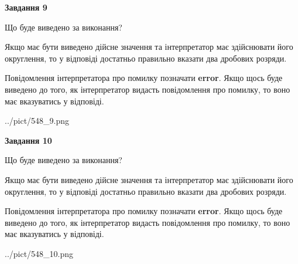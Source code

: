 \documentclass[12pt, ukrainian]{article}
\begin{document}
{\begin {Large}
{\begin {center}\textbf{Завдання 9}\end {center}}\par
Що буде виведено за виконання? \par

Якщо має бути виведено дійсне значення та інтерпретатор має здійснювати його округлення, 
то у відповіді достатньо правильно вказати два дробових розряди.

Повідомлення інтерпретатора про помилку позначати \textbf{error}.
Якщо щось буде виведено до того, як інтерпретатор видасть повідомлення про помилку, 
то воно має вказуватись у відповіді. \par

\begin{center}
	{../pict/548_9.png}
\end{center}
\newpage

{\begin {center}\textbf{Завдання 10}\end {center}}\par
Що буде виведено за виконання? \par

Якщо має бути виведено дійсне значення та інтерпретатор має здійснювати його округлення, 
то у відповіді достатньо правильно вказати два дробових розряди.

Повідомлення інтерпретатора про помилку позначати \textbf{error}.
Якщо щось буде виведено до того, як інтерпретатор видасть повідомлення про помилку, 
то воно має вказуватись у відповіді. \par

\begin{center}
	{../pict/548_10.png}
\end{center}
\newpage

\end {Large}}
\end{document}
